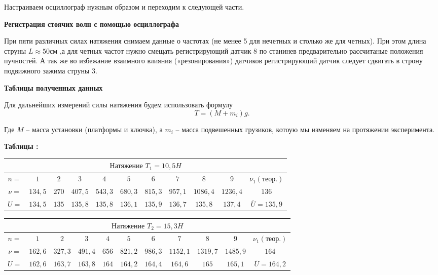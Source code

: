 \documentclass[a4paper,12pt]{article} %
\begin{document}
Настраиваем осциллограф нужным образом и переходим к следующей части.

{\bf  Регистрация стоячих волн с помощью осциллографа}

При пяти различных силах натяжения снимаем данные о частотах (не менее 5 для нечетных и столько же для четных). При этом длина струны $L \approx 50\textbf{см }$,а для четных частот нужно смещать регистрирующий датчик 8 по станинев предварительно рассчитаные положения пучностей. А так же во избежание взаимного влияния («резонирования») датчиков регистрирующий датчик следует сдвигать в строну подвижного зажима струны 3. 



{\bf Таблицы полученных данных}

Для дальнейших измерений силы натяжения будем использовать формулу \[ T = (M + m_i)g.\]

Где $M$ -- масса установки (платформы и ключка), а $m_i$ -- масса подвешенных грузиков, котоую мы изменяем на протяжении эксперимента.



\newpage
{\bf Таблицы :}\\

\begin{center}

\begin{tabular}{|c|c|c|c|c|c|c|c|c|c|c|}
\hline 
\multicolumn{11}{|c|}{$\textbf{Натяжение } T_1 = 10,5H$ } \\ 
\hline 
$n=$ & $1$ & $2$ & $3$ & $4$ & $5$ & $6$ & $7$ & $8$ & $9$ & $\nu_1(\textbf{теор.})$\\ 
\hline 
$\nu=$ & $134,5$ & $270$ & $407,5$ & $543,3$ & $680,3$ & $815,3$ & $957,1$ & $1086,4$ & $1236,4$ & $136$\\
\hline
$U = $ & $134,5$ & $135$ & $135,8$ & $135,8$ & $136,1$ & $135,9$ & $136,7$ & $135,8$ & $137,4$ & $\overline{U} = 135,9$\\

\hline 
\end{tabular} 

\end{center}

\begin{center}

\begin{tabular}{|c|c|c|c|c|c|c|c|c|c|c|}
\hline 
\multicolumn{11}{|c|}{$\textbf{Натяжение } T_2 = 15,3 H$ } \\ 
\hline 
$n=$ & $1$ & $2$ & $3$ & $4$ & $5$ & $6$ & $7$ & $8$ & $9$ & $\nu_1(\textbf{теор.})$\\ 
\hline 
$\nu=$ & $162,6$ & $327,3$ & $491,4$ & $656$ & $821,2$ & $986,3$ & $1152,1$ & $1319,7$ & $1485,9$ & $164$\\ 
\hline
$U = $ & $162,6$ & $163,7$ & $163,8$ & $164$ & $164,2$ & $164,4$ & $164,6$ & $165$ & $165,1$ & $\overline{U}= 164,2$\\

\hline 
\end{tabular} 

\end{center}
\end{document}
